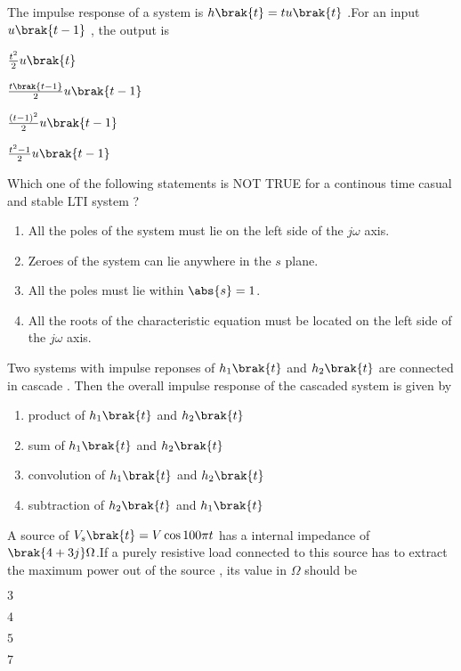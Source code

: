 \item The impulse response of a system is $h\brak{t}=tu\brak{t}$ .For an input $u\brak{t-1}$ , the output is 
\begin{enumerate}
\begin{multicols}{4}
\item $ \frac{t^2}{2}u\brak{t} $
\item $ \frac{t\brak{t-1}}{2}u\brak{t-1} $
\item $ \frac{(t-1)^2}{2}u\brak{t-1} $
\item $ \frac{t^2 - 1}{2}u\brak{t-1} $
\end{multicols}
\end{enumerate}
\item Which one of the following statements is NOT TRUE for a continous time casual and stable LTI system ? 
\begin{enumerate}
\item All the poles of the system must lie on the left side of the $j\omega$ axis.
\item  Zeroes of the system can lie anywhere in the $s$ plane.
\item All the poles must lie within $\abs{s}=1$.
\item All the roots of the characteristic equation must be located on the left side of the $j\omega$ axis.
\end{enumerate}
\item Two systems with impulse reponses of $h_1\brak{t}$ and $h_2\brak{t}$ are connected in cascade . Then the overall impulse response of the cascaded system is given by
\begin{enumerate}
\item product of $h_1\brak{t}$ and $h_2\brak{t}$  
\item sum of $h_1\brak{t}$ and $h_2\brak{t}$
\item convolution of $h_1\brak{t}$ and $h_2\brak{t}$ 
\item subtraction of $h_2\brak{t}$ and $h_1\brak{t}$ 
\end{enumerate}
\item A source of $V_s\brak{t}=V\cos{100\pi t}$ has a internal impedance of $\brak{4+3j}\Omega$.If a purely resistive load connected to this source has to extract the maximum power out of the source , its value in $\Omega$ should be 
\begin{enumerate}
\begin{multicols}{4}
\item $3$ 
\item $4$
\item $5$ 
\item $7$
\end{multicols}
\end{enumerate}
